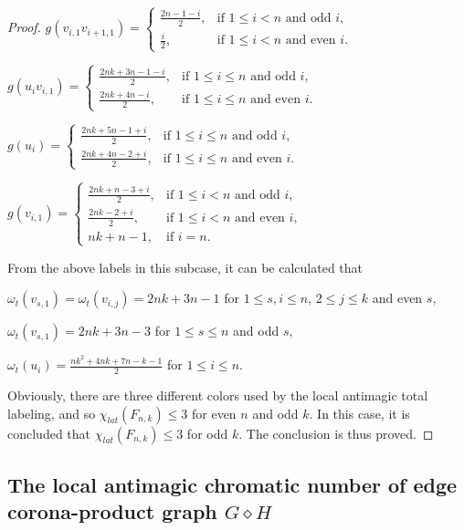 \documentclass[12pt]{article}
\begin{document}
\begin{proof}
$g(v_{i,1}v_{i+1,1})=\begin{cases}
                       \frac{2n-1-i}{2}, & \text{if $1\leq i<n$ and odd $i$},\\[4pt]
                       \frac{i}{2}, & \text{if $1\leq i<n$ and even $i$}.\end{cases}$\vspace{0.4em}

$ g(u_{i}v_{i,1})=\begin{cases}
           \frac{2nk+3n-1-i}{2}, & \text{if $1\leq i\leq n$ and odd $i$},\\[4pt]
           \frac{2nk+4n-i}{2}, & \text{if $1\leq i\leq n$ and even $i$}.\end{cases}$\vspace{0.4em}

$g(u_{i})=\begin{cases}
    \frac{2nk+5n-1+i}{2}, & \text{if $1\leq i\leq n$ and odd $i$},\\[4pt]
    \frac{2nk+4n-2+i}{2}, & \text{if $1\leq i\leq n$ and even $i$}.\end{cases}$\vspace{0.4em}

$g(v_{i,1})=\begin{cases}
           \frac{2nk+n-3+i}{2}, & \text{if $1\leq i<n$ and odd $i$},\\[4pt]
            \frac{2nk-2+i}{2},    & \text{if $1\leq i<n$ and even $i$},\\[4pt]
                       nk+n-1, &\text{if } i=n.\end{cases}$\vspace{0.4em}

\noindent From the above labels in this subcase, it can be calculated that

$\omega_{t}(v_{s,1})=\omega_{t}(v_{i,j})=2nk+3n-1$ for $1\leq s,i\leq n$, $2\leq j\leq k$ and even $s$,

$\omega_{t}(v_{s,1})=2nk+3n-3$ for $1\leq s\leq n$ and odd $s$,

$\omega_{t}(u_{i})=\frac{nk^{2}+4nk+7n-k-1}{2}$ for $1\leq i\leq n$.

\noindent Obviously, there are three different colors used by the local antimagic total labeling, and so $\chi_{lat}(F_{n,k})\leq 3$ for even $n$ and odd $k$. In this case, it is concluded that $\chi_{lat}(F_{n,k})\leq 3$ for odd $k$. The conclusion is thus proved.\end{proof}

\subsection{The local antimagic chromatic number of edge corona-product graph $G\diamond H$}%
\end{document}
